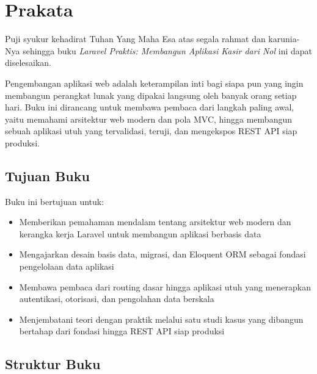 
\chapter*{Prakata}

Puji syukur kehadirat Tuhan Yang Maha Esa atas segala rahmat dan karunia-Nya
sehingga buku \textit{Laravel Praktis: Membangun Aplikasi Kasir dari Nol}
ini dapat diselesaikan.

Pengembangan aplikasi web adalah keterampilan inti bagi siapa pun yang ingin
membangun perangkat lunak yang dipakai langsung oleh banyak orang setiap hari.
Buku ini dirancang untuk membawa pembaca dari langkah paling awal, yaitu
memahami arsitektur web modern dan pola MVC, hingga membangun sebuah aplikasi
utuh yang tervalidasi, teruji, dan mengekspos REST API siap produksi.

\section*{Tujuan Buku}

Buku ini bertujuan untuk:

\begin{itemize}
    \item Memberikan pemahaman mendalam tentang arsitektur web modern dan
          kerangka kerja Laravel untuk membangun aplikasi berbasis data
    \item Mengajarkan desain basis data, migrasi, dan Eloquent ORM sebagai
          fondasi pengelolaan data aplikasi
    \item Membawa pembaca dari routing dasar hingga aplikasi utuh yang
          menerapkan autentikasi, otorisasi, dan pengolahan data berskala
    \item Menjembatani teori dengan praktik melalui satu studi kasus yang
          dibangun bertahap dari fondasi hingga REST API siap produksi
\end{itemize}

\section*{Struktur Buku}

